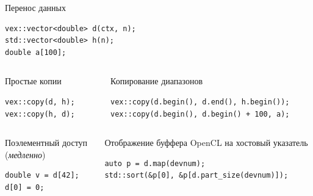\documentclass[@BEAMER_OPTIONS@]{beamer}
\begin{document}
\begin{frame}[fragile]{Перенос данных}
    \begin{exampleblock}{}
        \begin{lstlisting}
vex::vector<double> d(ctx, n);
std::vector<double> h(n);
double a[100];
        \end{lstlisting}
    \end{exampleblock}
    \vspace{\baselineskip}
    \begin{columns}
        \begin{column}{0.4\textwidth}
            \begin{exampleblock}{Простые копии}
                \begin{lstlisting}
vex::copy(d, h);
vex::copy(h, d);
                \end{lstlisting}
            \end{exampleblock}
        \end{column}
        \begin{column}{0.5\textwidth}
            \begin{exampleblock}{Копирование диапазонов}
                \begin{lstlisting}
vex::copy(d.begin(), d.end(), h.begin());
vex::copy(d.begin(), d.begin() + 100, a);
                \end{lstlisting}
            \end{exampleblock}
        \end{column}
    \end{columns}
    \vspace{\baselineskip}
    \begin{columns}
        \begin{column}{0.4\textwidth}
            \begin{exampleblock}{Поэлементный доступ\\ (\emph{медленно})}
                \begin{lstlisting}
double v = d[42];
d[0] = 0;
                \end{lstlisting}
            \end{exampleblock}
        \end{column}
        \begin{column}{0.5\textwidth}
            \begin{exampleblock}{Отображение буффера OpenCL на хостовый указатель}
                \begin{lstlisting}
auto p = d.map(devnum);
std::sort(&p[0], &p[d.part_size(devnum)]);
                \end{lstlisting}
            \end{exampleblock}
        \end{column}
    \end{columns}
\end{frame}
\end{document}
